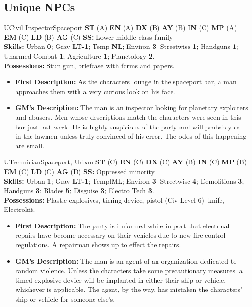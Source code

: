 \hrulefill

\subsection{Unique NPCs}
\label{sec:unique-npcs}

\setcounter{npc}{0}
\begin{npc}{U}{Civil Inspector}{Spaceport}
\textbf{ST} (A) \textbf{EN} (A) \textbf{DX} (B) \textbf{AY} (B) \textbf{IN} (C) \textbf{MP} (A) \textbf{EM} (C) \textbf{LD} (B) \textbf{AG} (C) \textbf{SS:} Lower middle class family \\
\textbf{Skills:} Urban \textbf{0}; Grav \textbf{LT-1}; Temp \textbf{NL}; Environ \textbf{3}; Streetwise \textbf{1}; Handguns \textbf{1}; Unarmed Combat \textbf{1}; Agriculture \textbf{1}; Planetology \textbf{2}. \\
\textbf{Possessions:} Stun gun, briefcase with forms and papers. 
\begin{itemize}
\item \textbf{First Description:} As the characters lounge in the spaceport bar, a man approaches them with a very curious look on his face. 
\item \textbf{GM's Description:} The man is an inspector looking for planetary exploiters and abusers. Men whose descriptions match the 
characters were seen in this bar just last week. He is highly suspicious of the party and will probably call in the lawmen unless truly 
convinced of his error. The odds of this happening are small. 
\end{itemize}
\end{npc}

\hrulefill

\begin{npc}{U}{Technician}{Spaceport, Urban}
\textbf{ST} (C) \textbf{EN} (C) \textbf{DX} (C) \textbf{AY} (B) \textbf{IN} (C) \textbf{MP} (B) \textbf{EM} (C) \textbf{LD} (C) \textbf{AG} (D) 
\textbf{SS:} Oppressed minority \\
\textbf{Skills:} Urban \textbf{1}; Grav \textbf{LT-1}; TempIML; Environ \textbf{3}; Streetwise \textbf{4}; Demolitions \textbf{3}; Handguns \textbf{3}; Blades \textbf{5}; Disguise \textbf{3}; Electro Tech \textbf{3}. \\
\textbf{Possessions:} Plastic explosives, timing device, pistol (Civ Level 6), knife, Electrokit. 
\begin{itemize}
\item \textbf{First Description:} The party is i nformed while in port that electrical repairs have become necessary on their vehicles due to new fire 
control regulations. A repairman shows up to effect the repairs. 
\item \textbf{GM's Description:} The man is an agent of an organization dedicated to random violence. Unless the characters take some 
precautionary measures, a timed explosive device will be implanted in either their ship or vehicle, whichever is applicable. The agent, 
by the way, has mistaken the characters' ship or vehicle for someone else's. 
\end{itemize}
\end{npc}

